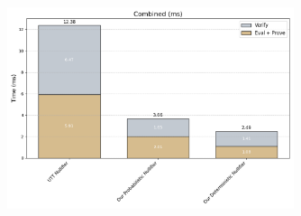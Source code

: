 \begin{figure}[ht]
    \centering
    \begin{minipage}{\textwidth}
        \centering
        \includegraphics[width=0.75\textwidth]{figures/chap4_private_nullifier_combined.png}
    \end{minipage}
    

\end{figure}
